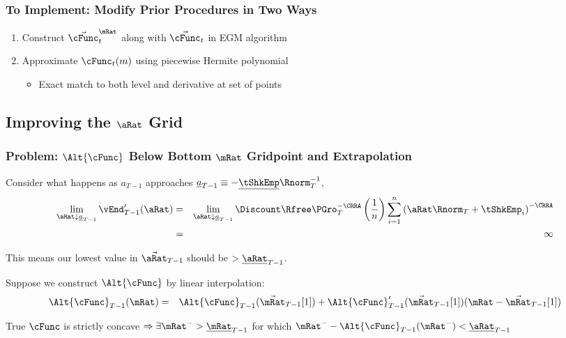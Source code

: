\documentclass{beamer}
\begin{document}
\begin{frame}
\frametitle{To Implement: Modify Prior Procedures in Two Ways}
\begin{enumerate}
\item Construct $\vec{\cFunc}^{\mRat}_{t}$ along with $\vec{\cFunc}_{t}$ in EGM algorithm
\item Approximate $\cFunc_{t}(m)$ using piecewise Hermite polynomial
\begin{itemize}
\item Exact match to both level and derivative at set of points
\end{itemize}
\end{enumerate}
\end{frame}

\subsection{Improving the $\aRat$ Grid}

\begin{frame}
\frametitle{Problem: $\Alt{\cFunc}$ Below Bottom $\mRat$ Gridpoint and Extrapolation}

Consider what happens as ${a}_{T-1}$ approaches $\underline{a}_{T-1}\equiv-\underline{\tShkEmp}\Rnorm_{T}^{-1}$,
\begin{eqnarray*}
        \lim_{{\aRat} \downarrow \underline{a}_{T-1}} \vEnd_{T-1}^{\prime}({\aRat}) & = &
        \lim_{{\aRat} \downarrow \underline{a}_{T-1}} \Discount \Rfree \PGro_{T}^{-\CRRA} \left(\frac{1}{n}\right) \sum_{i=1}^{n} \left( {\aRat} \Rnorm_{T}+ \tShkEmp_{i}\right)^{-\CRRA}
\\ & = & \infty
\end{eqnarray*}

This means our lowest value in $\vec{\aRat}_{T-1}$ should be $> \underline{\aRat}_{T-1}$.  

\medskip
Suppose we construct $\Alt{\cFunc}$ by linear interpolation:
\begin{eqnarray*}
  \Alt{\cFunc}_{T-1}(\mRat) &  = & \Alt{\cFunc}_{T-1}(\vec{\mRat}_{T-1}[1])+\Alt{\cFunc}_{T-1}^{\prime}(\vec{\mRat}_{T-1}[1])({\mRat}-\vec{\mRat}_{T-1}[1]) \label{eq:ExtrapLin}
\end{eqnarray*}

True $\cFunc$ is strictly concave 
$\Rightarrow \exists \mRat^{-} > \underline{\mRat}_{T-1}$  for which $\mRat^{-}-\Alt{\cFunc}_{T-1}(\mRat^{-}) < \underline{\aRat}_{T-1}$

\end{frame}
\end{document}
